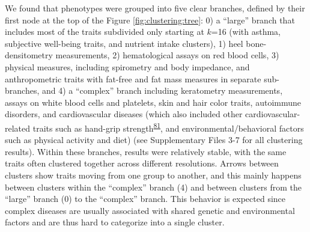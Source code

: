 \documentclass[
  a4paper,
]{article}
\begin{document}
We found that phenotypes were grouped into five clear branches, defined by their first node at the top of the Figure \ref{fig:clustering:tree}:
0) a ``large'' branch that includes most of the traits subdivided only starting at \(k\)=16 (with asthma, subjective well-being traits, and nutrient intake clusters),
1) heel bone-densitometry measurements,
2) hematological assays on red blood cells,
3) physical measures, including spirometry and body impedance, and anthropometric traits with fat-free and fat mass measures in separate sub-branches, and
4) a ``complex'' branch including keratometry measurements, assays on white blood cells and platelets, skin and hair color traits, autoimmune disorders, and cardiovascular diseases (which also included other cardiovascular-related traits such as hand-grip strength\textsuperscript{\protect\hyperlink{ref-aBVh8zt1}{81}}, and environmental/behavioral factors such as physical activity and diet) (see Supplementary Files 3-7 for all clustering results).
Within these branches, results were relatively stable, with the same traits often clustered together across different resolutions.
Arrows between clusters show traits moving from one group to another, and this mainly happens between clusters within the ``complex'' branch (4) and between clusters from the ``large'' branch (0) to the ``complex'' branch.
This behavior is expected since complex diseases are usually associated with shared genetic and environmental factors and are thus hard to categorize into a single cluster.
\end{document}
